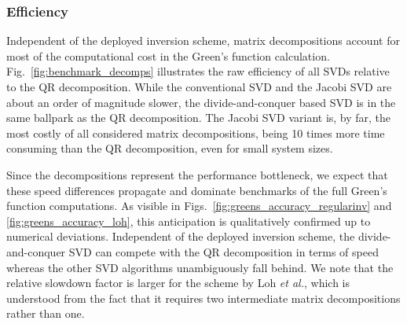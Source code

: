 \documentclass[submission, Phys]{SciPost}
\begin{document}
%		
%		
%		
%		
%		
%		
%		



\subsubsection{Efficiency}

Independent of the deployed inversion scheme, matrix decompositions account for most of the computational cost in the Green's function calculation. Fig.~\ref{fig:benchmark_decomps} illustrates the raw efficiency of all SVDs relative to the QR decomposition. While the conventional SVD and the Jacobi SVD are about an order of magnitude slower, the divide-and-conquer based SVD is in the same ballpark as the QR decomposition. The Jacobi SVD variant is, by far, the most costly of all considered matrix decompositions, being 10 times more time consuming than the QR decomposition, even for small system sizes.

Since the decompositions represent the performance bottleneck, we expect that these speed differences propagate and dominate benchmarks of the full Green's function computations. As visible in Figs.~\ref{fig:greens_accuracy_regularinv} and \ref{fig:greens_accuracy_loh}, this anticipation is qualitatively confirmed up to numerical deviations. Independent of the deployed inversion scheme, the divide-and-conquer SVD can compete with the QR decomposition in terms of speed whereas the other SVD algorithms unambiguously fall behind. We note that the relative slowdown factor is larger for the scheme by Loh \textit{et al.}, which is understood from the fact that it requires two intermediate matrix decompositions rather than one.
\end{document}
